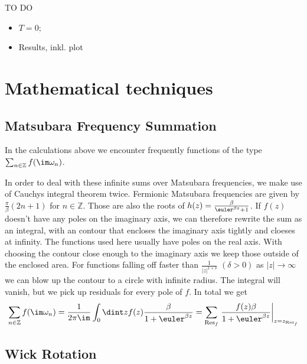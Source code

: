 \documentclass[a4paper,10pt]{report}
\begin{document}
TO DO
\begin{itemize}
 \item $T=0$;
 \item Results, inkl. plot
\end{itemize}









\appendix

\chapter{Mathematical techniques}

\section{Matsubara Frequency Summation} \label{MFS}

In the calculations above we encounter frequently functions of the type 
$ \sum_{n \in \mathbb{Z}} f(\im \omega_n)$.

In order to deal with these infinite sums over Matsubara frequencies, we make use of Cauchys integral theorem twice.
Fermionic Matsubara frequencies are given by $\frac{\pi}{\beta}(2n+1)$ for $n \in \mathbb{Z}$.
Those are also the roots of $h(z) = \frac{\beta}{\euler^{\beta z}+1}$.
If $f(z)$ doesn't have any poles on the imaginary axis, we can therefore rewrite the sum as an integral, 
with an contour that encloses the imaginary axis tightly and cloeses at infinity.
The functions used here usually have poles on the real axis. 
With choosing the contour close enough to the imaginary axis we keep those outside of the enclosed area.
For functions falling off faster than $\frac{1}{|z|^{1+\delta}}$ $(\delta>0)$ as $|z|\rightarrow \infty$ we can blow up the contour to a
circle with infinite radius. The integral will vanish, but we pick up residuals for every pole of $f$.
In total we get
\begin{equation}
 \sum_{n\in\mathbb{Z}} f(\im \omega_n) = \frac{1}{2\pi \im} \int_0 \dint z f(z)\frac{\beta}{1+\euler^{\beta z }} 
 = \sum_{\mathrm{Res}_f} \left. \frac{f(z)\beta}{1+\euler^{\beta z }}\right|_{z=z_{\mathrm{Res}_f}}
\end{equation}

\section{Wick Rotation}






\end{document}
